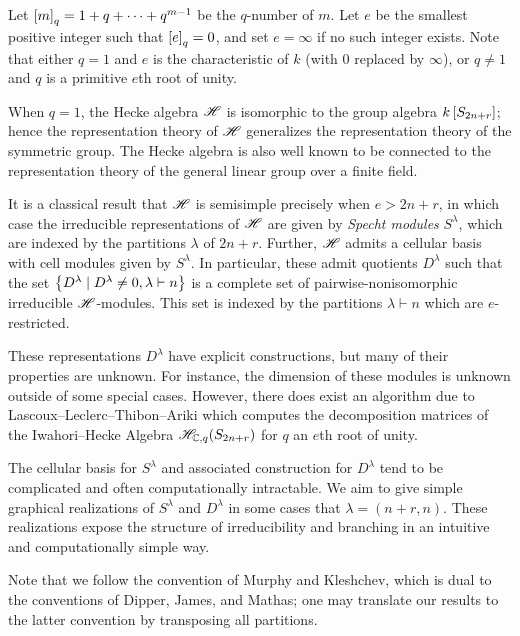 \documentclass{amsart}
\begin{document}
  Let $\left[ m \right]_q = 1 + q + \dots + q^{m-1}$ be the $q$-number of $m$. 
  Let $e$ be the smallest positive integer such that $\left[ e \right]_q = 0$, and set $e = \infty$ if no such integer exists.
  Note that either $q = 1$ and $e$ is the characteristic of $k$ (with $0$ replaced by $\infty$), or $q \neq 1$ and $q$ is a primitive $e$th root of unity.

  \vspace{5pt}
  When $q = 1$, the Hecke algebra $\mathscr{H}$ is isomorphic to the group algebra $k\left[ S_{2n+r} \right]$;
  hence the representation theory of $\mathscr{H}$ generalizes the representation theory of the symmetric group.
  The Hecke algebra is also well known to be connected to the representation theory of the general linear group over a finite field.\cite{Mathas-book}

  It is a classical result that $\mathscr{H}$ is semisimple precisely when $e > 2n + r$, in which case the irreducible representations of $\mathscr{H}$ are given by \emph{Specht modules} $S^\lambda$, which are indexed by the partitions $\lambda$ of $2n + r$.
  Further, $\mathscr{H}$ admits a cellular basis with cell modules given by $S^\lambda$.
  In particular, these admit quotients $D^\lambda$ such that the set $\left\{ D^\lambda \mid D^\lambda \neq 0, \lambda \vdash n \right\}$ is a complete set of pairwise-nonisomorphic irreducible $\mathscr{H}$-modules.
  This set is indexed by the partitions $\lambda \vdash n$ which are $e$-restricted.\cite{Murphy1,Murphy2}
  
  These representations $D^\lambda$ have explicit constructions, but many of their properties are unknown.
  For instance, the dimension of these modules is unknown outside of some special cases.\cite{Mathas-book}
  However, there does exist an algorithm due to Lascoux--Leclerc--Thibon--Ariki which computes the decomposition matrices of the Iwahori--Hecke Algebra $\mathscr{H}_{\mathbb{C},q}(S_{2n + r})$ for $q$ an $e$th root of unity.\cite{LLT,Ariki}
  
  The cellular basis for $S^\lambda$ and associated construction for $D^\lambda$ tend to be complicated and often computationally intractable.
  We aim to give simple graphical realizations of $S^\lambda$ and $D^\lambda$ in some cases that $\lambda = (n+r,n)$.
  These realizations expose the structure of irreducibility and branching in an intuitive and computationally simple way.

  \vspace{5pt}
  Note that we follow the convention of Murphy and Kleshchev, which is dual to the conventions of Dipper, James, and Mathas;
  one may translate our results to the latter convention by transposing all partitions.\cite{Kleshchev,Mathas-book,Murphy1} 
  
\end{document}
